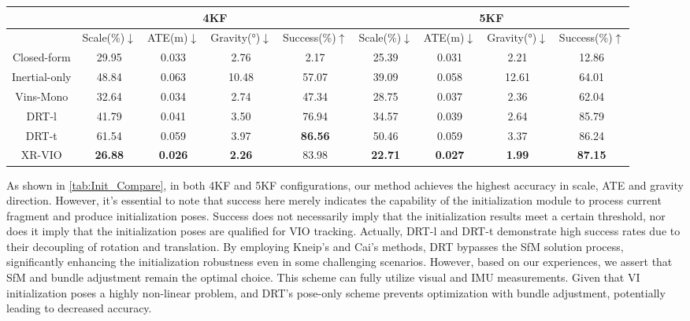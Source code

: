 \begin{table*}[t]

    \caption{Initialization Evaluation on EuRoC. Bold font indicates the best result. We compare these methods under 2 different configuration: 4KF and 5KF, both including scale, ATE, gravity, and success rate.}
    \centering
    \begin{tabular}{c|cccc|cccc}
    \toprule
 & \multicolumn{4}{c|}{4KF} &\multicolumn{4}{c}{5KF}\\
         \midrule
         &  Scale(\%)$\downarrow$&  ATE(m)$\downarrow$&  Gravity(°)$\downarrow$&Success(\%)$\uparrow$& Scale(\%)$\downarrow$& ATE(m)$\downarrow$& Gravity(°)$\downarrow$& Success(\%)$\uparrow$\\
         \midrule
         Closed-form\cite{genevaopenvins}& 29.95 & 0.033 & 2.76 & 2.17 & 25.39 & 0.031 & 2.21 & 12.86 \\
         Inertial-only\cite{campos2020inertial}&  48.84&  0.063&  10.48&57.07 & 39.09& 0.058& 12.61&64.01\\
         Vins-Mono\cite{qin-tro-2018_VINS-Mono}&  32.64&  0.034&  2.74&47.34 & 28.75& 0.037& 2.36&62.04\\
         DRT-l\cite{Rotation-Translation-Decoupled}&  41.79&  0.041&  3.50&76.94 & 34.57& 0.039& 2.64&85.79\\
         DRT-t\cite{Rotation-Translation-Decoupled}&  61.54&  0.059&  3.97&\textbf{86.56} & 50.46& 0.059& 3.37& 86.24\\
         XR-VIO&  \textbf{26.88}&  \textbf{0.026}&  \textbf{2.26}&83.98 & \textbf{22.71}& \textbf{0.027}& \textbf{1.99}&\textbf{87.15}\\
         \bottomrule
    \end{tabular}
    \label{tab:Init_Compare}
\end{table*}


As shown in \cref{tab:Init_Compare}, in both 4KF and 5KF configurations, our method achieves the highest accuracy in scale, ATE and gravity direction. However, it's essential to note that success here merely indicates the capability of the initialization module to process current fragment and produce initialization poses. Success does not necessarily imply that the initialization results meet a certain threshold, nor does it imply that the initialization poses are qualified for VIO tracking. Actually, DRT-l and DRT-t demonstrate high success rates due to their decoupling of rotation and translation. By employing Kneip's\cite{Kneip_Lynen_2013-rotation} and Cai's\cite{Cai_2021-pose-only} methods, DRT bypasses the SfM solution process, significantly enhancing the initialization robustness even in some challenging scenarios. However, based on our experiences, we assert that SfM and bundle adjustment remain the optimal choice. This scheme can fully utilize visual and IMU measurements. Given that VI initialization poses a highly non-linear problem, and DRT's pose-only scheme prevents optimization with bundle adjustment, potentially leading to decreased accuracy.

